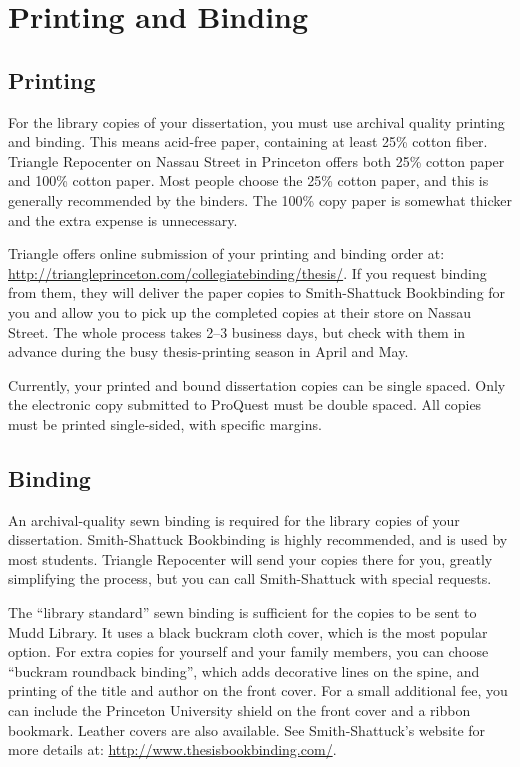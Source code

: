 \chapter{Printing and Binding\label{ch:printing}}

\section{Printing}

For the library copies of your dissertation, you must use archival quality printing and binding. This means acid-free paper, containing at least 25\% cotton fiber. Triangle Repocenter on Nassau Street in Princeton offers both 25\% cotton paper and 100\% cotton paper. Most people choose the 25\% cotton paper, and this is generally recommended by the binders. The 100\% copy paper is somewhat thicker and the extra expense is unnecessary.

Triangle offers online submission of your printing and binding order at: \url{http://triangleprinceton.com/collegiatebinding/thesis/}. If you request binding from them, they will deliver the paper copies to Smith-Shattuck Bookbinding for you and allow you to pick up the completed copies at their store on Nassau Street. The whole process takes 2--3 business days, but check with them in advance during the busy thesis-printing season in April and May.

Currently, your printed and bound dissertation copies can be single spaced. Only the electronic copy submitted to ProQuest must be double spaced. All copies must be printed single-sided, with specific margins.

\section{Binding}

An archival-quality sewn binding is required for the library copies of your dissertation. Smith-Shattuck Bookbinding is highly recommended, and is used by most students. Triangle Repocenter will send your copies there for you, greatly simplifying the process, but you can call Smith-Shattuck with special requests.

The ``library standard'' sewn binding is sufficient for the copies to be sent to Mudd Library. It uses a black buckram cloth cover, which is the most popular option. For extra copies for yourself and your family members, you can choose ``buckram roundback binding'', which adds decorative lines on the spine, and printing of the title and author on the front cover. For a small additional fee, you can include the Princeton University shield on the front cover and a ribbon bookmark. Leather covers are also available. See Smith-Shattuck's website for more details at: \url{http://www.thesisbookbinding.com/}.

